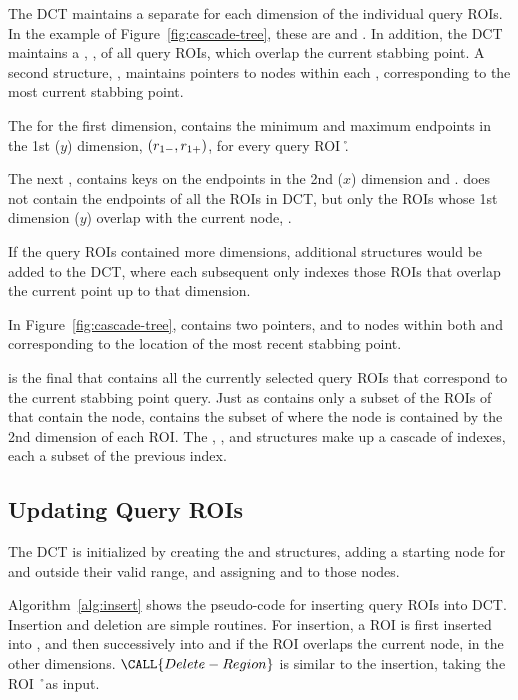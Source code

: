 \documentclass{ucdthesis}       %
\newcommand{\proc}[1]{\ensuremath{\CALL{#1}}}
\begin{document}
The \ac{DCT} maintains a separate  for each dimension of the
individual query \acp{ROI}.  In the example of Figure~\ref{fig:cascade-tree},
these are  and .  In addition, the \ac{DCT} maintains a , , of
all query \acp{ROI}, which overlap the current stabbing point.  A second
structure, , maintains pointers to nodes within each ,
corresponding to the most current stabbing point.

The  for the first dimension,  contains the minimum and
maximum endpoints in the 1st ($y$) dimension, $(r_{1-},r_{1+})$, for
every query \ac{ROI} \r.

The next ,  contains keys on the endpoints in the 2nd ($x$)
dimension and \rid.   does not contain the endpoints of all the
\acp{ROI} in \ac{DCT}, but only the \acp{ROI} whose 1st dimension ($y$)
overlap with the current node, .

If the query \acp{ROI} contained more dimensions, additional  
structures would be added to the \ac{DCT}, where each subsequent  
only indexes those \acp{ROI} that overlap the current point up to that
dimension.

In Figure~\ref{fig:cascade-tree},  contains two pointers,  and
 to nodes within both  and  corresponding to the location
of the most recent stabbing point.

 is the final  that contains all the currently selected query
\acp{ROI} that correspond to the current stabbing point query.  Just as
 contains only a subset of the \acp{ROI} of  that contain the
 node,  contains the subset of  where the  node is
contained by the 2nd dimension of each \ac{ROI}.  The , , and  
structures make up a cascade of indexes, each a subset of the previous
index.

\subsection{Updating Query \acp{ROI}}

The \ac{DCT} is initialized by creating the  and
 structures, adding a starting node for  and 
outside their valid range, and assigning  and  to
those nodes.

Algorithm~\ref{alg:insert} shows the pseudo-code for inserting query
\acp{ROI} into \ac{DCT}.  Insertion and deletion are simple
routines. For insertion, a \ac{ROI} is first inserted into ,
and then successively into  and  if the \ac{ROI}
overlaps the current node,  in the other dimensions.
\proc{Delete-Region} is similar to the insertion, taking the \ac{ROI}
\r\ as input.
\end{document}
